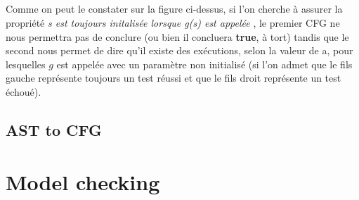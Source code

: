 \documentclass{report}
\begin{document}
\paragraph{}
\hspace{4mm}\textnormal{Comme on peut le constater sur la figure ci-dessus, si l'on cherche \`{a} assurer la propri\'{e}t\'{e} \textit{\og s est toujours initalis\'{e}e lorsque g(s) est appel\'{e}e \fg{}}, le premier CFG ne nous permettra pas de conclure (ou bien il concluera \textbf{true}, \`{a} tort) tandis que le second nous permet de dire qu'il existe des ex\'{e}cutions, selon la valeur de a, 
pour lesquelles $g$ est appel\'{e}e avec un param\`{e}tre non initialis\'{e} (si l'on admet que le fils gauche repr\'{e}sente toujours un test r\'{e}ussi et que le fils droit repr\'{e}sente un test \'{e}chou\'{e}).}

\section{AST to CFG}

\chapter{Model checking}
\end{document}
